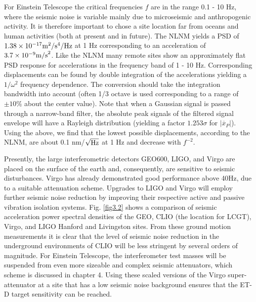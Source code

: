 For Einstein Telescope the critical frequencies $f$ are in the range 0.1 - 10 Hz, where the seismic noise is variable mainly due to microseismic and anthropogenic activity. It is therefore important to chose a site location far from oceans and human activities (both at present and in future). The NLNM yields a PSD of $1.38 \times 10^{-17}{\rm m}^2/{\rm s}^4/{\rm Hz}$ at 1 Hz corresponding to an acceleration of $3.7 \times 10^{-9}{\rm m/s}^{2}$. Like the NLNM many remote sites show an approximately flat PSD response for accelerations in the frequency band of 1 - 10 Hz. Corresponding displacements can be found by double integration of the accelerations yielding a $1/\omega^2$ frequency dependence. The conversion should take the integration bandwidth into account (often 1/3 octave is used corresponding to a range of $\pm 10 \%$ about the center value). Note that when a Gaussian signal is passed through a narrow-band filter, the absolute peak signals of the filtered signal envelope will have a Rayleigh distribution (yielding a factor $1.253 \sigma$ for $\vert \overline{x}_P \vert$). Using the above, we find that the lowest possible displacements, according to the NLNM, are about 0.1 nm/$\sqrt{\rm Hz}$ at 1 Hz and decrease with $f^{-2}$.

Presently, the large interferometric detectors GEO600, LIGO, and Virgo are placed on the surface of the earth and, consequently, are sensitive to seismic disturbances. Virgo has already demonstrated good performance above 40Hz, due to a suitable attenuation scheme. Upgrades to LIGO and Virgo will employ further seismic noise reduction by improving their respective active and passive vibration isolation systems. Fig. \ref{fig3.2} shows a comparison of seismic acceleration power spectral densities of the GEO, CLIO (the location for LCGT), Virgo, and LIGO Hanford and Livingston sites. From these ground motion measurements it is clear that the level of seismic noise reduction in the underground environments of CLIO will be less stringent by several orders of magnitude. For Einstein Telescope, the interferometer test masses will be suspended from even more sizeable and complex seismic attenuators, which scheme is discussed in chapter 4. Using these scaled versions of the Virgo super-attenuator at a site that has a low seismic noise background ensures that the ET-D target sensitivity can be reached. 


